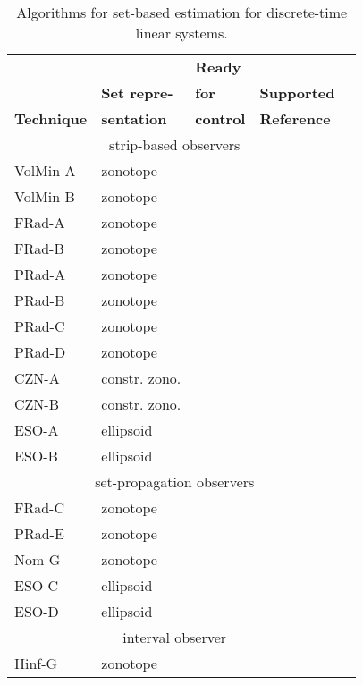 \begin{table*}[tb]
	\caption{Algorithms for set-based estimation for discrete-time linear systems.}
	\centering
	\label{tab:implementedObserversLinear}
	\begin{tabular}{llllc}
		\toprule
		& & {\bf Ready} \\
		& {\bf Set repre-} & {\bf for} & {\bf Supported} \\
		{\bf Technique} & {\bf sentation} & {\bf control} & {\bf Reference} \\
		\midrule
		\multicolumn{4}{c}{strip-based observers} \\
		\midrule
		VolMin-A &  zonotope &      \xmark & \cite{Alamo2005} \\
		VolMin-B &  zonotope &      \xmark & \cite{Bravo2006a} \\
		FRad-A &    zonotope &      \xmark & \cite{Alamo2005} \\
		FRad-B &    zonotope &      \xmark & \cite{Wang2018a} \\
		PRad-A &    zonotope &      \xmark & \cite{Le2013} \\
		PRad-B &    zonotope &      \xmark & \cite{Le2013a} \\
		PRad-C &    zonotope &      \xmark & \cite{Wang2018} \\
		PRad-D &    zonotope &      \xmark & \cite{Wang2019} \\
		CZN-A &     constr. zono. & \xmark & \cite{Scott2016} \\
		CZN-B &     constr. zono. & \xmark & \cite{Alanwar2020b} \\
		ESO-A &     ellipsoid &     \xmark & \cite{Gollamudi1996,Liu2016} \\
		ESO-B &     ellipsoid &     \xmark & \cite{Liu2016} \\
		\midrule
		\multicolumn{4}{c}{set-propagation observers} \\
		\midrule
		FRad-C &    zonotope &      \cmark & \cite{Combastel2015} \\
		PRad-E &    zonotope &      \cmark & \cite{Wang2017b} \\
		Nom-G &     zonotope &      \cmark & \cite{Wang2018a} \\
		ESO-C &     ellipsoid &     \cmark & \cite{Loukkas2017} \\
		ESO-D &     ellipsoid &     \cmark & \cite{Martinez2020} \\
		\midrule
		\multicolumn{4}{c}{interval observer} \\
		\midrule
		Hinf-G &    zonotope &      \cmark & \cite{Tang2019} \\
		\bottomrule
	\end{tabular}
\end{table*}



